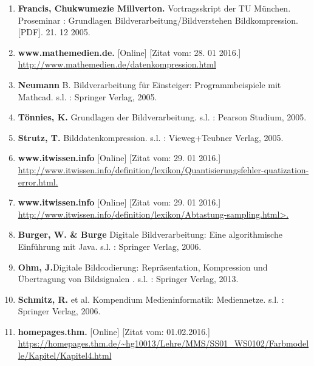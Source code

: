 \begin{enumerate}
\item \textbf{Francis, Chukwumezie Millverton.} Vortragsskript der TU München. Proseminar : Grundlagen Bildverarbeitung/Bildverstehen Bildkompression. [PDF]. 21. 12 2005.
\item \textbf{www.mathemedien.de.} [Online] [Zitat vom: 28. 01 2016.] \url{http://www.mathemedien.de/datenkompression.html}

\item \textbf{Neumann} B. Bildverarbeitung für Einsteiger: Programmbeispiele mit Mathcad. s.l. : Springer Verlag, 2005.

\item \textbf{Tönnies, K.} Grundlagen der Bildverarbeitung. s.l. : Pearson Studium, 2005.

\item \textbf{Strutz, T.} Bilddatenkompression. s.l. : Vieweg+Teubner Verlag, 2005.

\item  \textbf{www.itwissen.info} [Online] [Zitat vom: 29. 01 2016.] \url{http://www.itwissen.info/definition/lexikon/Quantisierungsfehler-quatization-error.html.}

\item \textbf{www.itwissen.info} [Online] [Zitat vom: 29. 01 2016.] \url{http://www.itwissen.info/definition/lexikon/Abtastung-sampling.html>.}

\item \textbf{Burger, W. \& Burge} Digitale Bildverarbeitung: Eine algorithmische Einführung mit Java. s.l. : Springer Verlag, 2006.

\item \textbf{Ohm, J.}Digitale Bildcodierung: Repräsentation, Kompression und Übertragung von Bildsignalen . s.l. : Springer Verlag, 2013.

\item \textbf{Schmitz, R.} et al. Kompendium Medieninformatik: Mediennetze. s.l. : Springer Verlag, 2006.

\item \textbf{homepages.thm.} [Online] [Zitat vom: 01.02.2016.]\\
\url{https://homepages.thm.de/~hg10013/Lehre/MMS/SS01_WS0102/Farbmodelle/Kapitel/Kapitel4.html}
\end{enumerate}


